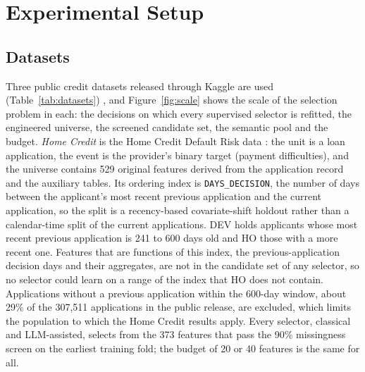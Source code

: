 \documentclass[final,5p,twocolumn]{elsarticle}
\providecommand{\DIFaddtex}[1]{{\protect\color{blue} \sf #1}} %
\providecommand{\DIFaddbegin}{} %
\providecommand{\DIFaddend}{} %
\providecommand{\DIFadd}[1]{\texorpdfstring{\DIFaddtex{#1}}{#1}} %
\begin{document}
\section{Experimental Setup}
\label{sec:experimental_setup}

\subsection{Datasets}
\label{subsec:datasets}

Three public credit datasets released through Kaggle are used (Table~\ref{tab:datasets})\DIFaddbegin \DIFadd{, and Figure~\ref{fig:scale} shows the scale of the selection problem in each: the decisions on which every supervised selector is refitted, the engineered universe, the screened candidate set, the semantic pool and the budget}\DIFaddend . \emph{Home Credit} is the Home Credit Default Risk data \cite{homecredit2018}: the unit is a loan application, the event is the provider's binary target (payment difficulties), and the universe contains 529 original features derived from the application record and the auxiliary tables. Its ordering index is \texttt{DAYS\_DECISION}, the number of days between the applicant's most recent previous application and the current application, so the split is a recency-based covariate-shift holdout rather than a calendar-time split of the current applications. DEV holds applicants whose most recent previous application is 241 to 600 days old and HO those with a more recent one. Features that are functions of this index, the previous-application decision days and their aggregates, are not in the candidate set of any selector, so no selector could learn on a range of the index that HO does not contain. Applications without a previous application within the 600-day window, about 29\% of the 307,511 applications in the public release, are excluded, which limits the population to which the Home Credit results apply. Every selector, classical and LLM-assisted, selects from the 373 features that pass the 90\% missingness screen on the earliest training fold; the budget of 20 or 40 features is the same for all.
\end{document}
